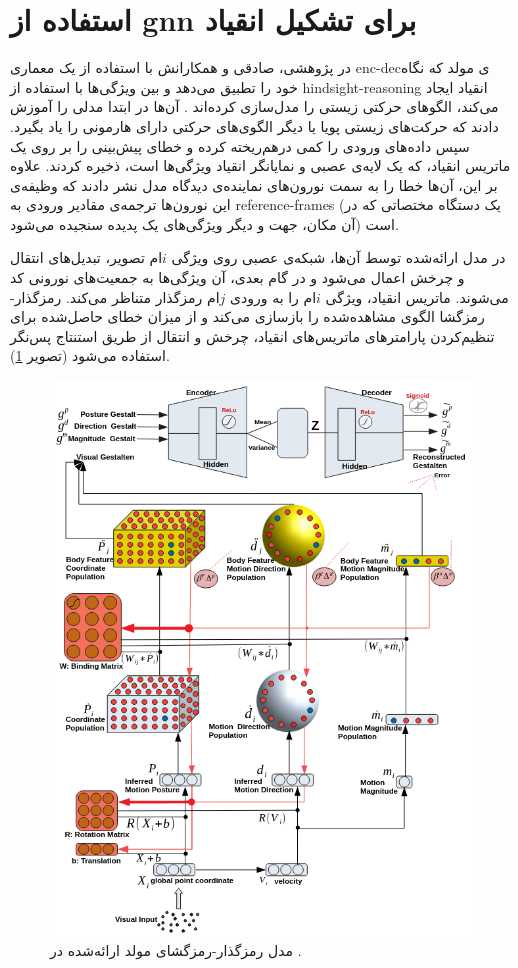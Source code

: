 \documentclass[12pt]{report}
\begin{document}
\section{استفاده از \gls{gnn} برای تشکیل انقیاد}
در پژوهشی، صادقی و همکارانش با استفاده از یک معماری \gls{enc-dec}ی مولد که نگاه خود را تطبیق می‌دهد و بین ویژگی‌ها با استفاده از \gls{hindsight-reasoning} انقیاد ایجاد می‌کند، الگو‌های حرکتی زیستی را مدل‌سازی کرده‌اند \cite{Sadeghi2021}.
آن‌ها در ابتدا مدلی را آموزش دادند که حرکت‌های زیستی پویا یا دیگر الگوی‌های حرکتی دارای‌ هارمونی را یاد بگیرد. سپس داده‌های ورودی را کمی درهم‌ریخته‌ کرده و خطای پیش‌بینی را بر روی یک ماتریس انقیاد، که یک لایه‌ی عصبی و نمایانگر انقیاد ویژگی‌ها است، ذخیره کردند. علاوه‌ بر این، آن‌ها خطا را به سمت نورون‌های نماینده‌ی دیدگاه مدل نشر دادند که وظیفه‌ی این نورون‌ها ترجمه‌ی مقادیر ورودی به \gls{reference-frames} (یک دستگاه مختصاتی که در آن مکان، جهت و دیگر ویژگی‌های یک پدیده سنجیده می‌شود) است.

در مدل ارائه‌شده توسط آن‌ها، شبکه‌ی عصبی روی ویژگی $i$ام تصویر، تبدیل‌های انتقال و چرخش اعمال می‌شود و در گام بعدی، آن ویژگی‌ها به جمعیت‌های نورونی کد می‌شوند. ماتریس انقیاد، ویژگی $i$ام را به ورودی $j$ام رمزگذار متناظر می‌کند. رمزگذار-رمزگشا الگوی مشاهده‌شده را بازسازی می‌کند و از میزان خطای حاصل‌شده برای تنظیم‌کردن پارامتر‌های ماتریس‌های انقیاد، چرخش و انتقال  از طریق استنتاج پس‌نگر استفاده می‌شود (تصویر \ref{fig:gnn}).

\begin{figure}[]
	\centering
	\includegraphics[width=0.8\linewidth]{gnn.png}
	\caption[NS]{
		مدل رمزگذار-رمزگشای مولد ارائه‌شده در  \cite{Sadeghi2021}.
	}
	\label{fig:gnn}
\end{figure}
\end{document}
